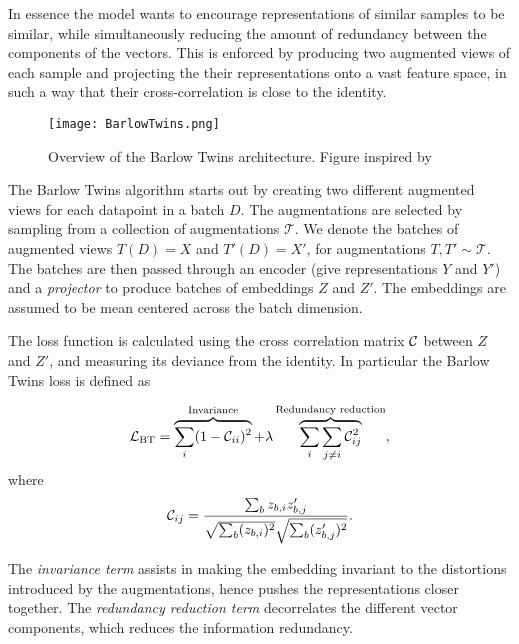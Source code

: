 \documentclass[../../thesis.tex]{subfiles}
\begin{document}
In essence the model wants to encourage representations of similar samples to be similar, while simultaneously reducing the amount of redundancy between the components of the vectors. This is enforced by producing two augmented views of each sample and projecting the their representations onto a vast feature space, in such a way that their cross-correlation is close to the identity. \newline

\begin{figure}[h]
    \texttt{[image: BarlowTwins.png]}
    \centering    
    \caption{Overview of the Barlow Twins architecture. Figure inspired by \cite{zbontar2021barlow}}
\end{figure}

The Barlow Twins algorithm starts out by creating two different augmented views for each datapoint in a batch $D$. The augmentations are selected by sampling from a collection of augmentations $\mathcal{T}$. We denote the batches of augmented views $T(D) = X$ and $T'(D) =X'$, for augmentations $T,T'\sim \mathcal{T}$.  The batches are then passed through an encoder (give representations $Y$ and $Y'$) and a \textit{projector} to produce batches of embeddings $Z$ and $Z'$. The embeddings are assumed to be mean centered across the batch dimension. \newline

The loss function is calculated using the cross correlation matrix $\mathcal{C}$ between $Z$ and $Z'$, and measuring its deviance from the identity. In particular the Barlow Twins loss is defined as

\begin{equation}
    \mathcal{L}_{\text{BT}} = 
    \overbrace{\sum_i (1 - \mathcal{C}_{ii})^2}^{\text{Invariance}}
    +\lambda  \overbrace{\sum_i\sum_{j\neq i} \mathcal{C}_{ij}^2}^{\text{Redundancy reduction}},
\end{equation}
where
\begin{equation}
    \mathcal{C}_{ij} = \frac{\sum_b z_{b,i}z_{b,j}'}{\sqrt{\sum_b (z_{b,i})^2}\sqrt{\sum_b (z_{b,j}')^2}}.
\end{equation}

The \textit{invariance term} assists in making the embedding invariant to the distortions introduced by the augmentations, hence pushes the representations closer together. The \textit{redundancy reduction term} decorrelates the different vector components, which reduces the information redundancy. \newline
\end{document}
